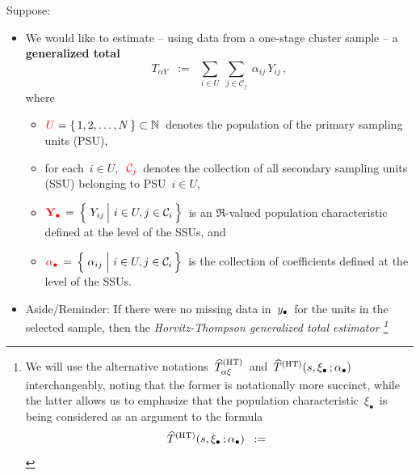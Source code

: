 Suppose:
\begin{itemize}
\item
    We would like to estimate
    -- using data from a one-stage cluster sample --
    a \textbf{generalized total}
    \begin{equation*}
    T_{\alpha Y}
    \;\; := \;\;
        \underset{i \in U}{\sum}\;
        \underset{j \in \mathcal{C}_{j}}{\sum}\;
        \alpha_{ij}\,Y_{ij}\,,
    \end{equation*}
    where
    \begin{itemize}
    \item
        ${\color{red}U} = \{\,1,2,\ldots,N\,\} \subset \mathbb{N}$\,
        denotes the population of the primary sampling units (PSU),
    \item
        for each \,$i \in U$,\,
        \,${\color{red}\mathcal{C}_{j}}$\,
        denotes the collection of all secondary sampling units (SSU) belonging to PSU \,$i \in U$,
    \item
        $
        {\color{red}\Ydot} \, = \, \left\{\,
            \left.
            \overset{{\color{white}.}}{Y_{ij}}
            \,\right\vert\,
            i \in U, j \in \mathcal{C}_{i}
            \,\right\}
        $\,
        is an $\Re$-valued population characteristic defined at the level of the SSUs, and
    \item
        $
        {\color{red}\abullet} \, = \, \left\{\,
            \left.
            \overset{{\color{white}1}}{\alpha_{ij}}
            \;\right\vert\,
            i \in U, j \in \mathcal{C}_{i}
            \,\right\}
        $\,
        is the collection of coefficients defined at the level of the SSUs.
    \end{itemize}
\item
    Aside/Reminder:
    \vskip 0.01cm
    \noindent
    If there were no missing data in \,$y_{\bullet}$\, for the units in the selected sample,
    then the \textit{Horvitz-Thompson generalized total estimator\! \footnote{
        We will use the alternative notations
        \,$\widehat{T}_{\alpha\xi}^{\textnormal{(HT)}}$\,
        and
        \,$\widehat{T}^{\textnormal{(HT)}}(s,\xi_{\bullet}\,;\alpha_{\bullet})$\,
        interchangeably, noting that the former is notationally more succinct,
        while the latter allows us to emphasize that the population characteristic
        \,$\xi_{\bullet}$\,
        is being considered as an argument to the formula
        \begin{equation*}
        \widehat{T}^{\textnormal{(HT)}}(s,\xi_{\bullet}\,;\abullet)
        \;\; := \;\;

\end{equation*}}}
\end{itemize}
